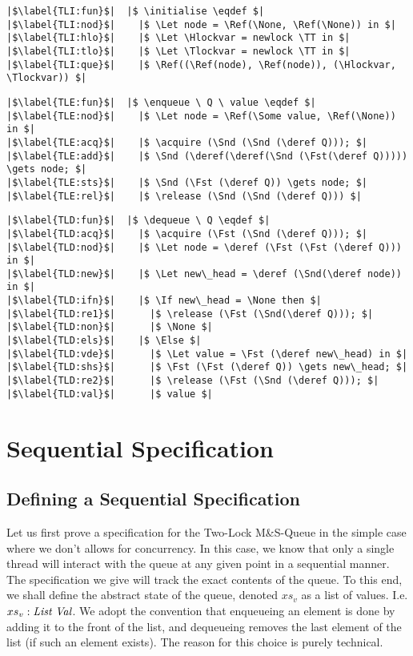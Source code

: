 \documentclass[a4paper, 10pt]{report}
\theoremstyle{definition}
\newcommand{\acquire}{\operatorname{acquire}}
\newcommand{\release}{\operatorname{release}}
\newcommand{\initialise}{\operatorname{initialize}}
\newcommand{\enqueue}{\operatorname{enqueue}}
\newcommand{\dequeue}{\operatorname{dequeue}}
\newcommand{\msq}{M\&S-Queue\xspace}
\newcommand{\tlmsq}{Two-Lock \msq}
\newcommand{\absvalueList}{xs_v}
\newcommand{\Hlockvar}{H\_lock}
\newcommand{\Tlockvar}{T\_lock}
\begin{document}
\begin{verbatim}
|$\label{TLI:fun}$|  |$ \initialise \eqdef $|
|$\label{TLI:nod}$|    |$ \Let node = \Ref(\None, \Ref(\None)) in $|
|$\label{TLI:hlo}$|    |$ \Let \Hlockvar = newlock \TT in $|
|$\label{TLI:tlo}$|    |$ \Let \Tlockvar = newlock \TT in $|
|$\label{TLI:que}$|    |$ \Ref((\Ref(node), \Ref(node)), (\Hlockvar, \Tlockvar)) $|
\end{verbatim}

\begin{verbatim}
|$\label{TLE:fun}$|  |$ \enqueue \ Q \ value \eqdef $|
|$\label{TLE:nod}$|    |$ \Let node = \Ref(\Some value, \Ref(\None)) in $|
|$\label{TLE:acq}$|    |$ \acquire (\Snd (\Snd (\deref Q))); $|
|$\label{TLE:add}$|    |$ \Snd (\deref(\deref(\Snd (\Fst(\deref Q))))) \gets node; $|
|$\label{TLE:sts}$|    |$ \Snd (\Fst (\deref Q)) \gets node; $|
|$\label{TLE:rel}$|    |$ \release (\Snd (\Snd (\deref Q))) $|
\end{verbatim}

\begin{verbatim}
|$\label{TLD:fun}$|  |$ \dequeue \ Q \eqdef $|
|$\label{TLD:acq}$|    |$ \acquire (\Fst (\Snd (\deref Q))); $|
|$\label{TLD:nod}$|    |$ \Let node = \deref (\Fst (\Fst (\deref Q))) in $|
|$\label{TLD:new}$|    |$ \Let new\_head = \deref (\Snd(\deref node)) in $|
|$\label{TLD:ifn}$|    |$ \If new\_head = \None then $|
|$\label{TLD:re1}$|      |$ \release (\Fst (\Snd(\deref Q))); $|
|$\label{TLD:non}$|      |$ \None $|
|$\label{TLD:els}$|    |$ \Else $|
|$\label{TLD:vde}$|      |$ \Let value = \Fst (\deref new\_head) in $|
|$\label{TLD:shs}$|      |$ \Fst (\Fst (\deref Q)) \gets new\_head; $|
|$\label{TLD:re2}$|      |$ \release (\Fst (\Snd (\deref Q))); $|
|$\label{TLD:val}$|      |$ value $|
\end{verbatim}


\chapter{Sequential Specification}
\label{ch:TLMSQSEQ}

\section{Defining a Sequential Specification}
\label{TLMSQSEQ:section:sequential-spec}

Let us first prove a specification for the \tlmsq in the simple case where we don't allows for concurrency. In this case, we know that only a single thread will interact with the queue at any given point in a sequential manner. The specification we give will track the exact contents of the queue. To this end, we shall define the abstract state of the queue, denoted $\absvalueList$ as a list of \heaplang values. I.e. $\absvalueList : \List ~ \Val$. We adopt the convention that enqueueing an element is done by adding it to the front of the list, and dequeueing removes the last element of the list (if such an element exists). The reason for this choice is purely technical.
\end{document}
